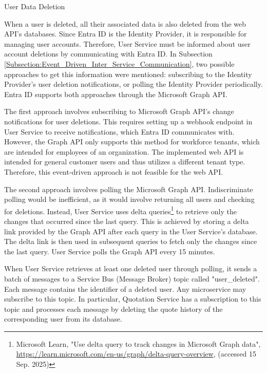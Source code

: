 \documentclass[12pt, reqno]{amsbook}
\makeatletter
\def\subsection{\@startsection{subsection}{2}%
      \z@{.5\linespacing\@plus.7\linespacing}{.25\linespacing}%
      {\normalfont\bfseries\flushleft}}
\theoremstyle{definition}
\theoremstyle{definition}
\numberwithin{section}{chapter}
\numberwithin{table}{chapter}
\numberwithin{figure}{chapter}
\makeatother
\begin{document}
\subsection{User Data Deletion}
\label{Subsection:User_Data_Deletion}

When a user is deleted, all their associated data is also deleted from the web \ac{API}'s databases. Since Entra ID is the Identity Provider, it is responsible for managing user accounts. Therefore, User Service must be informed about user account deletions by communicating with Entra ID. In Subsection \ref{Subsection:Event_Driven_Inter_Service_Communication}, two possible approaches to get this information were mentioned: subscribing to the Identity Provider's user deletion notifications, or polling the Identity Provider periodically. Entra ID supports both approaches through the Microsoft Graph \ac{API}.

The first approach involves subscribing to Microsoft Graph \ac{API}'s change notifications for user deletions. This requires setting up a webhook endpoint in User Service to receive notifications, which Entra ID communicates with. However, the Graph \ac{API} only supports this method for workforce tenants, which are intended for employees of an organization. The implemented web \ac{API} is intended for general customer users and thus utilizes a different tenant type. Therefore, this event-driven approach is not feasible for the web \ac{API}.

The second approach involves polling the Microsoft Graph \ac{API}. Indiscriminate polling would be inefficient, as it would involve returning all users and checking for deletions. Instead, User Service uses delta queries\footnote{Microsoft Learn, "Use delta query to track changes in Microsoft Graph data", \url{https://learn.microsoft.com/en-us/graph/delta-query-overview}, (accessed 15 Sep. 2025)} to retrieve only the changes that occurred since the last query. This is achieved by storing a delta link provided by the Graph \ac{API} after each query in the User Service's database. The delta link is then used in subsequent queries to fetch only the changes since the last query. User Service polls the Graph \ac{API} every 15 minutes.

When User Service retrieves at least one deleted user through polling, it sends a batch of messages to a Service Bus (Message Broker) topic called "user\_deleted". Each message contains the identifier of a deleted user. Any microservice may subscribe to this topic. In particular, Quotation Service has a subscription to this topic and processes each message by deleting the quote history of the corresponding user from its database.
\end{document}
